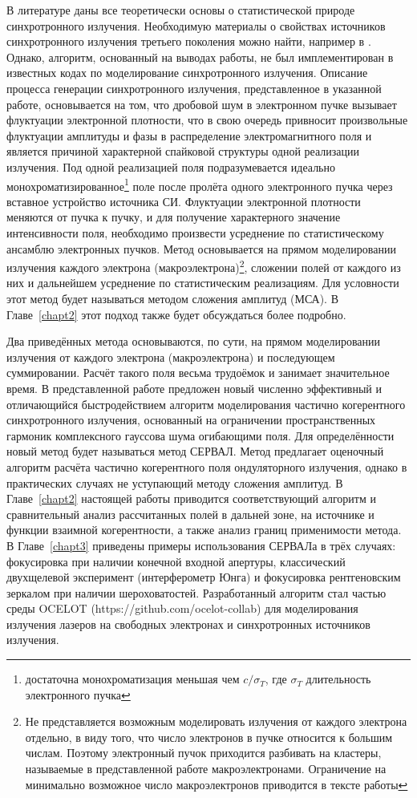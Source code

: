 В литературе даны все теоретически основы о статистической природе синхротронного излучения. Необходимую материалы о свойствах источников синхротронного излучения третьего поколения можно найти, например в \cite{geloni_transverse_2008}. Однако, алгоритм, основанный на выводах работы, не был имплементирован в известных кодах по моделирование синхротронного излучения. Описание процесса генерации синхротронного излучения, представленное в указанной работе, основывается на том, что дробовой шум в электронном пучке вызывает флуктуации электронной плотности, что в свою очередь привносит произвольные флуктуации амплитуды и фазы в распределение электромагнитного поля и является причиной характерной спайковой структуры одной реализации излучения. Под одной реализацией поля подразумевается идеально монохроматизированное\footnote{достаточна монохроматизация меньшая чем $c/\sigma_{T}$, где $\sigma_{T}$ длительность электронного пучка} поле после пролёта одного электронного пучка через вставное устройство источника СИ. Флуктуации электронной плотности меняются от пучка к пучку, и для получение характерного значение интенсивности поля, необходимо произвести усреднение по статистическому ансамблю электронных пучков. Метод основывается на прямом моделировании излучения каждого электрона (макроэлектрона)\footnote{Не представляется возможным моделировать излучения от каждого электрона отдельно, в виду того, что число электронов в пучке относится к большим числам. Поэтому электронный пучок приходится разбивать на кластеры, называемые в представленной работе макроэлектронами. Ограничение на минимально возможное число макроэлектронов приводится в тексте работы}, сложении полей от каждого из них и дальнейшем усреднение по статистическим реализациям. Для условности этот метод будет называться методом сложения амплитуд (МСА). В Главе~\ref{chapt2} этот подход также будет обсуждаться более подробно.

Два приведённых метода основываются, по сути, на прямом моделировании излучения от каждого электрона (макроэлектрона) и последующем суммировании. Расчёт такого поля весьма трудоёмок и занимает значительное время. В представленной работе предложен новый численно эффективный и отличающийся быстродействием алгоритм моделирования частично когерентного синхротронного излучения, основанный на ограничении пространственных гармоник комплексного гауссова шума огибающими поля. Для определённости новый метод будет называться метод СЕРВАЛ. Метод предлагает оценочный алгоритм расчёта частично когерентного поля ондуляторного излучения, однако в практических случаях не уступающий методу сложения амплитуд. В Главе~\ref{chapt2} настоящей работы приводится соответствующий алгоритм и сравнительный анализ рассчитанных полей в дальней зоне, на источнике и функции взаимной когерентности, а также анализ границ применимости метода. В Главе~\ref{chapt3} приведены примеры использования СЕРВАЛа в трёх случаях: фокусировка при наличии конечной входной апертуры, классический двухщелевой эксперимент (интерферометр Юнга) и фокусировка рентгеновским зеркалом при наличии шероховатостей. Разработанный алгоритм стал частью среды OCELOT (https://github.com/ocelot-collab) для моделирования излучения лазеров на свободных электронах и синхротронных источников излучения. 

